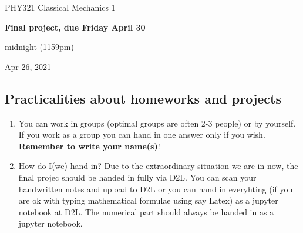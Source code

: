 \documentclass[%
oneside,                 %
final,                   %
10pt]{article}
\begin{document}

\newcommand{\exercisesection}[1]{\subsection*{#1}}






\thispagestyle{empty}

\begin{center}
{\LARGE\bf
\begin{spacing}{1.25}
PHY321 Classical Mechanics 1
\end{spacing}
}
\end{center}


\begin{center}
{\bf Final  project, due Friday April 30}
\end{center}

    \begin{center}
\centerline{{\small midnight (1159pm)}}
\end{center}
    

\begin{center}
Apr 26, 2021
\end{center}

\vspace{1cm}


\subsection{Practicalities about  homeworks and projects}

\begin{enumerate}
\item You can work in groups (optimal groups are often 2-3 people) or by yourself. If you work as a group you can hand in one answer only if you wish. \textbf{Remember to write your name(s)}!

\item How do I(we)  hand in?  Due to the extraordinary situation we are in now, the final projec should be handed in fully via D2L. You can scan your handwritten notes and upload to D2L or you can hand in everyhting (if you are ok with typing mathematical formulae using say Latex) as a jupyter notebook at D2L. The numerical part should always be handed in as a jupyter notebook.
\end{enumerate}
\end{document}
